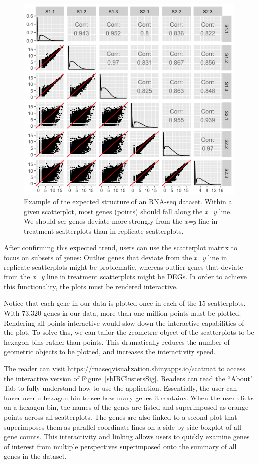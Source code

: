 \documentclass{bioinfo}
\begin{document}
\begin{figure}[!tpb]
\centerline{\includegraphics[width=\columnwidth]{../MakeFigures/sbCNSM.jpg}}
\caption{Example of the expected structure of an RNA-seq dataset. Within a given scatterplot, most genes (points) should fall along the \textit{x=y} line. We should see genes deviate more strongly from the \textit{x=y} line in treatment scatterplots than in replicate scatterplots. 
\label{sbCNSM}}
\end{figure}

After confirming this expected trend, users can use the scatterplot matrix to focus on subsets of genes: Outlier genes that deviate from the \textit{x=y} line in replicate scatterplots might be problematic, whereas outlier genes that deviate from the \textit{x=y} line in treatment scatterplots might be DEGs. In order to achieve this functionality, the plots must be rendered interactive.

Notice that each gene in our data is plotted once in each of the 15 scatterplots. With 73,320 genes in our data, more than one million points must be plotted. Rendering all points interactive would slow down the interactive capabilities of the plot. To solve this, we can tailor the geometric object of the scatterplots to be hexagon bins rather than points. This dramatically reduces the number of geometric objects to be plotted, and increases the interactivity speed.

The reader can visit https://rnaseqvisualization.shinyapps.io/scatmat to access the interactive version of Figure~\ref{sbIRClustersSig}. Readers can read the ``About" Tab to fully understand how to use the application. Essentially, the user can hover over a hexagon bin to see how many genes it contains. When the user clicks on a hexagon bin, the names of the genes are listed and superimposed as orange points across all scatterplots. The genes are also linked to a second plot that superimposes them as parallel coordinate lines on a side-by-side boxplot of all gene counts. This interactivity and linking allows users to quickly examine genes of interest from multiple perspectives superimposed onto the summary of all genes in the dataset. 
\end{document}
